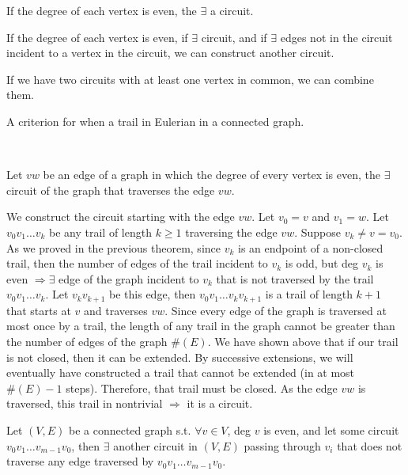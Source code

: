 \documentclass[10pt]{article}
\begin{document}
	\begin{description}
		\item[Lemma A:] If the degree of each vertex is even, the $\exists$ a circuit.
		\item[Lemma B:] If the degree of each vertex is even, if $\exists$ circuit, and if $\exists$ edges not in the circuit incident to a vertex in the circuit, we can construct another circuit.
		\item[Lemma C:] If we have two circuits with at least one vertex in common, we can combine them.
		\item[Lemma D:] A criterion for when a trail in Eulerian in a connected graph.
		\item ~\\
		\item[Lemma A:] Let $vw$ be an edge of a graph in which the degree of every vertex is even, the $\exists$ circuit of the graph that traverses the edge $vw$.
		\item[Proof:] We construct the circuit starting with the edge $vw$. Let $v_0 = v$ and $v_1 = w$. Let $v_0 v_1 \dots v_k$ be any trail of length $k \geq 1$ traversing the edge $vw$. Suppose $v_k \neq v = v_0$. As we proved in the previous theorem, since $v_k$ is an endpoint of a non-closed trail, then the number of edges of the trail incident to $v_k$ is odd, but deg $v_k$ is even $\Rightarrow \exists$ edge of the graph incident to $v_k$ that is not traversed by the trail $v_0 v_1 \dots v_k$. Let $v_k v_{k+1}$ be this edge, then $v_0 v_1 \dots v_k v_{k+1}$ is a trail of length $k+1$ that starts at $v$ and traverses $vw$. Since every edge of the graph is traversed at most once by a trail, the length of any trail in the graph cannot be greater than the number of edges of the graph $\#(E)$. We have shown above that if our trail is not closed, then it can be extended. By successive extensions, we will eventually have constructed a trail that cannot be extended (in at most $\#(E)-1$ steps). Therefore, that trail must be closed. As the edge $vw$ is traversed, this trail in nontrivial $\Rightarrow$ it is a circuit.
		\item[qed]
		\item[Lemma B:] Let $(V, E)$ be a connected graph s.t. $\forall v \in V$, deg $v$ is even, and let some circuit $v_0 v_1 \dots v_{m-1} v_0$, then $\exists$ another circuit in $(V, E)$ passing through $v_i$ that does not traverse any edge traversed by $v_0 v_1 \dots v_{m-1} v_0$.

\end{description}
\end{document}
